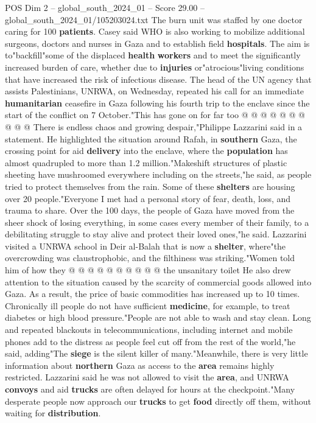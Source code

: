 \begin{textsample}{POS Dim 2 – global\_south\_2024\_01 – Score 29.00 – global\_south\_2024\_01/105203024.txt}
The burn unit was staffed by one doctor caring for 100 \textbf{patients}.
Casey said WHO is also working to mobilize additional surgeons, doctors and nurses in Gaza and to establish field \textbf{hospitals}.
The aim is to"backfill"some of the displaced \textbf{health} \textbf{workers} and to meet the significantly increased burden of care, whether due to \textbf{injuries} or"atrocious"living conditions that have increased the risk of infectious disease.
The head of the UN agency that assists Palestinians, UNRWA, on Wednesday, repeated his call for an immediate \textbf{humanitarian} ceasefire in Gaza following his fourth trip to the enclave since the start of the conflict on 7 October."This has gone on for far too @ @ @ @ @ @ @ @ @ @ There is endless chaos and growing despair,"Philippe Lazzarini said in a statement.
He highlighted the situation around Rafah, in \textbf{southern} Gaza, the crossing point for aid \textbf{delivery} into the enclave, where the \textbf{population} has almost quadrupled to more than 1.2 million."Makeshift structures of plastic sheeting have mushroomed everywhere including on the streets,"he said, as people tried to protect themselves from the rain.
Some of these \textbf{shelters} are housing over 20 people."Everyone I met had a personal story of fear, death, loss, and trauma to share.
Over the 100 days, the people of Gaza have moved from the sheer shock of losing everything, in some cases every member of their family, to a debilitating struggle to stay alive and protect their loved ones,"he said.
Lazzarini visited a UNRWA school in Deir al-Balah that is now a \textbf{shelter}, where"the overcrowding was claustrophobic, and the filthiness was striking."Women told him of how they @ @ @ @ @ @ @ @ @ @ the unsanitary toilet He also drew attention to the situation caused by the scarcity of commercial goods allowed into Gaza.
As a result, the price of basic commodities has increased up to 10 times.
Chronically ill people do not have sufficient \textbf{medicine}, for example, to treat diabetes or high blood pressure."People are not able to wash and stay clean.
Long and repeated blackouts in telecommunications, including internet and mobile phones add to the distress as people feel cut off from the rest of the world,"he said, adding"The \textbf{siege} is the silent killer of many."Meanwhile, there is very little information about \textbf{northern} Gaza as access to the \textbf{area} remains highly restricted.
Lazzarini said he was not allowed to visit the \textbf{area}, and UNRWA \textbf{convoys} and aid \textbf{trucks} are often delayed for hours at the checkpoint."Many desperate people now approach our \textbf{trucks} to get \textbf{food} directly off them, without waiting for \textbf{distribution}.

\end{textsample}

